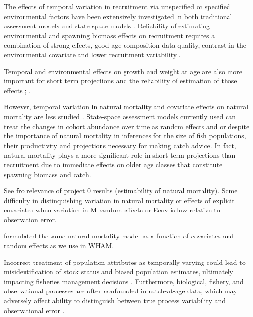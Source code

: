 \documentclass[
  12pt,
]{article}
\begin{document}
The effects of temporal variation in recruitment via unspecified or specified environmental factors have been extensively investigated in both traditional assessment models and state space models \citep{myers98, milleretal16, haltuchpapers}. Reliability of estimating environmental and spawning biomass effects on recruitment requires a combination of strong effects, good age composition data quality, contrast in the environmental covariate and lower recruitment variability \citep{brittenetal_inreview, milleretal_inreview1}.

Temporal and environmental effects on growth and weight at age are also more important for short term projections and the reliability of estimation of those effects \citet{correaetal23}; \citet{correaetalinreview}.

However, temporal variation in natural mortality and covariate effects on natural mortality are less studied \citet{cadigan16}. State-space assessment models currently used can treat the changes in cohort abundance over time as random effects and or despite the importance of natural mortality in inferences for the size of fish populations, their productivity and projections necessary for making catch advice. In fact, natural mortality plays a more significant role in short term projections than recruitment due to immediate effects on older age classes that constitute spawning biomass and catch.

See \citet{millerretal_inreview1} fro relevance of project 0 results (estimability of natural mortality). Some difficulty in distinquishing variation in natural mortality or effects of explicit covariates when variation in M random effects or Ecov is low relative to observation error.

\citet{derisoetal08} formulated the same natural mortality model as a function of covariates and random effects as we use in WHAM.

Incorrect treatment of population attributes as temporally varying \citep{trijouletetal20, liljestrandetal24} could lead to misidentification of stock status and biased population estimates, ultimately impacting fisheries management decisions \citep{legaultpalmer16, szuwalskietal18, croninpunt21}. Furthermore, biological, fishery, and observational processes are often confounded in catch-at-age data, which may adversely affect ability to distinguish between true process variability and observational error \citep{puntetal14, stewartmonnahan17, croninpunt21, fischetal23, lietalinreview_a}.
\end{document}
